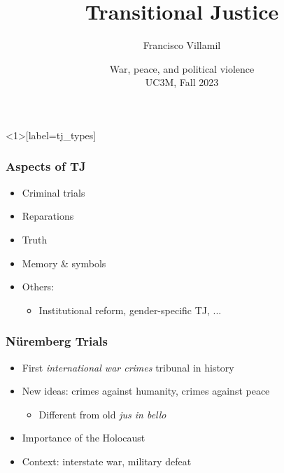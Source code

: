 \documentclass[aspectratio=43]{beamer}
\title{\huge Transitional Justice}
\author{Francisco Villamil}
\date{War, peace, and political violence\\UC3M, Fall 2023}
\begin{document}
\begin{frame}
  \titlepage
\end{frame}


\begin{frame}<1>[label=tj_types]
\frametitle{Aspects of TJ}
\centering

\begin{itemize}
  \item Criminal trials
  \item<2-> Reparations
  \item<3-> Truth
  \item<4-> Memory \& symbols
  \item<5-> Others:
  \begin{itemize}
    \item Institutional reform, gender-specific TJ, ...
  \end{itemize}
\end{itemize}

\end{frame}


\begin{frame}
\frametitle{Nüremberg Trials}
\centering

\begin{itemize}
  \item First \textit{international war crimes} tribunal in history
  \item<2-> New ideas: crimes against humanity, crimes against peace
  \begin{itemize}
    \item Different from old \textit{jus in bello}
  \end{itemize}
  \item<3-> Importance of the Holocaust
  \item<4-> Context: interstate war, military defeat
\end{itemize}

\end{frame}
\end{document}
